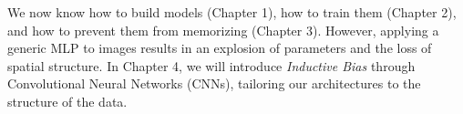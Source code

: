 \documentclass{tufte-handout}
\begin{document}
\begin{remark}
We now know how to build models (Chapter 1), how to train them (Chapter 2), and how to prevent them from memorizing (Chapter 3). However, applying a generic MLP to images results in an explosion of parameters and the loss of spatial structure. In Chapter 4, we will introduce \textit{Inductive Bias} through Convolutional Neural Networks (CNNs), tailoring our architectures to the structure of the data.
\end{remark}
\end{document}
